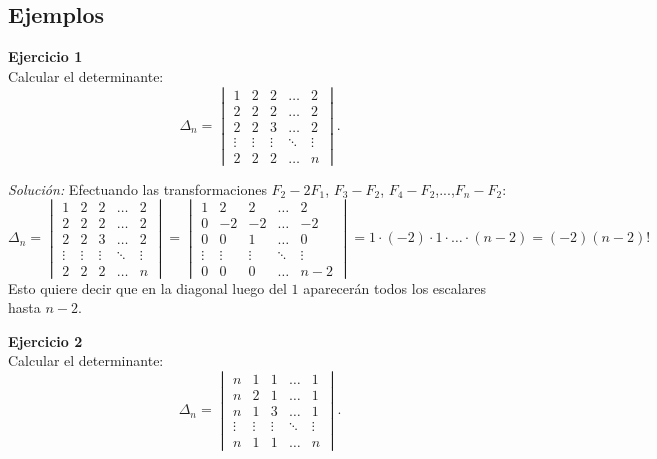 \documentclass{article}
\newenvironment{problem}[2][Ejercicio]
    { \begin{mdframed}[backgroundcolor=gray!20] \textbf{#1 #2} \\}
    {  \end{mdframed}}
\newenvironment{solution}
    {\textit{Solución:}}
    {}
\begin{document}
\subsection*{Ejemplos}
\begin{problem}{1}
    Calcular el determinante:
\[
\Delta_n = 
\begin{vmatrix}
1 & 2 & 2 & \dots & 2 \\
2 & 2 & 2 & \dots & 2 \\
2 & 2 & 3 & \dots & 2 \\
\vdots & \vdots & \vdots & \ddots & \vdots \\
2 & 2 & 2 & \dots & n
\end{vmatrix}.
\]
\end{problem}
\begin{solution}
    Efectuando las transformaciones $F_2-2F_1$, $F_3-F_2$, $F_4 - F_2$,...,$F_n-F_2$:
\[
\Delta_n = 
\begin{vmatrix}
1 & 2 & 2 & \dots & 2 \\
2 & 2 & 2 & \dots & 2 \\
2 & 2 & 3 & \dots & 2 \\
\vdots & \vdots & \vdots & \ddots & \vdots \\
2 & 2 & 2 & \dots & n
\end{vmatrix} = 
\begin{vmatrix}
1 & 2 & 2 & \dots & 2 \\
0 & -2 & -2 & \dots & -2 \\
0 & 0 & 1 & \dots & 0 \\
\vdots & \vdots & \vdots & \ddots & \vdots \\
0 & 0 & 0 & \dots & n-2
\end{vmatrix} = 1 \cdot (-2) \cdot 1 \cdot \dots \cdot (n-2) = (-2)(n-2)!
\]
Esto quiere decir que en la diagonal luego del $1$ aparecerán todos los escalares hasta $n-2$.
\end{solution}
\begin{problem}{2}
    Calcular el determinante:
\[
\Delta_n = \begin{vmatrix}
n & 1 & 1 & \dots & 1 \\
n & 2 & 1 & \dots & 1 \\
n & 1 & 3 & \dots & 1 \\
\vdots & \vdots & \vdots & \ddots & \vdots \\
n & 1 & 1 & \dots & n
\end{vmatrix}.
\]
\end{problem}
\end{document}
